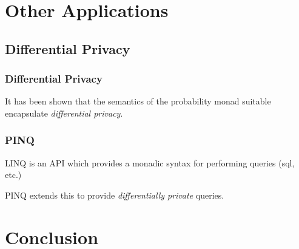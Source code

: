\documentclass[usenames,dvipsnames]{beamer}
\begin{document}
\section{Other Applications}
\subsection{Differential Privacy}
\begin{frame}
  \frametitle{Differential Privacy}
  It has been shown that the semantics of the
  probability monad suitable encapsulate \emph{differential privacy}.
\end{frame}
\begin{frame}
  \frametitle{PINQ}
  LINQ is an API which provides a monadic syntax for
  performing queries (sql, etc.)

  PINQ extends this to provide
  \emph{differentially private} queries.
\end{frame}
\section{Conclusion}
\end{document}

